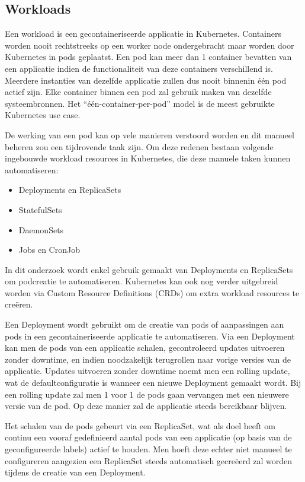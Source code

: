 \subsection{Workloads}
\label{sec:workloads}

Een workload is een gecontaineriseerde applicatie in Kubernetes. Containers worden nooit rechtstreeks op een worker node ondergebracht maar worden door Kubernetes in pods geplaatst. Een pod kan meer dan 1 container bevatten van een applicatie indien de functionaliteit van deze containers verschillend is. Meerdere instanties van dezelfde applicatie zullen dus nooit binnenin één pod actief zijn. Elke container binnen een pod zal gebruik maken van dezelfde systeembronnen. Het “één-container-per-pod” model is de meest gebruikte Kubernetes use case. \autocite{Kubernetes2022}

De werking van een pod kan op vele manieren verstoord worden en dit manueel beheren zou een tijdrovende taak zijn. Om deze redenen bestaan volgende ingebouwde workload resources in Kubernetes, die deze manuele taken kunnen automatiseren:
\begin{itemize}
    \item Deployments en ReplicaSets
    \item StatefulSets
    \item DaemonSets
    \item Jobs en CronJob
\end{itemize}   

In dit onderzoek wordt enkel gebruik gemaakt van Deployments en ReplicaSets om podcreatie te automatiseren. Kubernetes kan ook nog verder uitgebreid worden via Custom Resource Definitions (CRDs) om extra workload resources te creëren. 

Een Deployment wordt gebruikt om de creatie van pods of aanpassingen aan pods in een gecontaineriseerde applicatie te automatiseren. Via een Deployment kan men de pods van een applicatie schalen, gecontroleerd updates uitvoeren zonder downtime, en indien noodzakelijk terugrollen naar vorige versies van de applicatie.
Updates uitvoeren zonder downtime noemt men een rolling update, wat de defaultconfiguratie is wanneer een nieuwe Deployment gemaakt wordt. Bij een rolling update zal men 1 voor 1 de pods gaan vervangen met een nieuwere versie van de pod. Op deze manier zal de applicatie steeds bereikbaar blijven. 

Het schalen van de pods gebeurt via een ReplicaSet, wat als doel heeft om continu een vooraf gedefinieerd aantal pods van een applicatie (op basis van de geconfigureerde labels) actief te houden. Men hoeft deze echter niet manueel te configureren aangezien een ReplicaSet steeds automatisch gecreëerd zal worden tijdens de creatie van een Deployment. 

